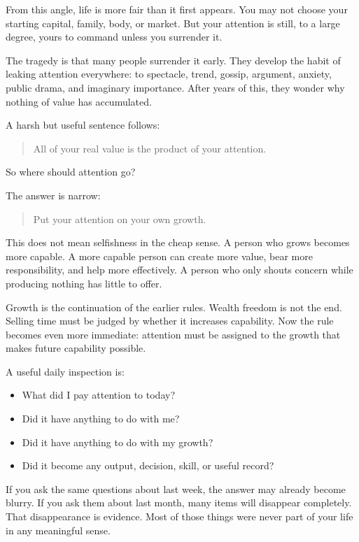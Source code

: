 From this angle, life is more fair than it first appears. You may not choose your starting capital, family, body, or market. But your attention is still, to a large degree, yours to command unless you surrender it.

The tragedy is that many people surrender it early. They develop the habit of leaking attention everywhere: to spectacle, trend, gossip, argument, anxiety, public drama, and imaginary importance. After years of this, they wonder why nothing of value has accumulated.

A harsh but useful sentence follows:

\begin{quote}
All of your real value is the product of your attention.
\end{quote}

So where should attention go?

The answer is narrow:

\begin{quote}
Put your attention on your own growth.
\end{quote}

This does not mean selfishness in the cheap sense. A person who grows becomes more capable. A more capable person can create more value, bear more responsibility, and help more effectively. A person who only shouts concern while producing nothing has little to offer.

Growth is the continuation of the earlier rules. Wealth freedom is not the end. Selling time must be judged by whether it increases capability. Now the rule becomes even more immediate: attention must be assigned to the growth that makes future capability possible.

A useful daily inspection is:

\begin{itemize}
\item What did I pay attention to today?
\item Did it have anything to do with me?
\item Did it have anything to do with my growth?
\item Did it become any output, decision, skill, or useful record?
\end{itemize}

If you ask the same questions about last week, the answer may already become blurry. If you ask them about last month, many items will disappear completely. That disappearance is evidence. Most of those things were never part of your life in any meaningful sense.

